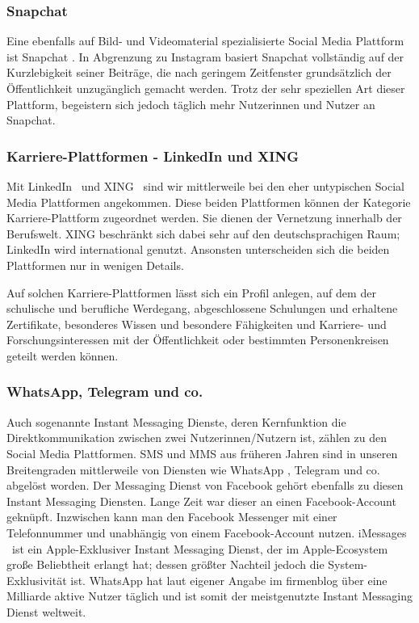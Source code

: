 \subsubsection{Snapchat}

Eine ebenfalls auf Bild- und Videomaterial spezialisierte Social Media Plattform ist Snapchat \faSnapchat. In Abgrenzung zu Instagram basiert Snapchat vollständig auf der Kurzlebigkeit seiner Beiträge, die nach geringem Zeitfenster grundsätzlich der Öffentlichkeit unzugänglich gemacht werden. Trotz der sehr speziellen Art dieser Plattform, begeistern sich jedoch täglich mehr Nutzerinnen und Nutzer an Snapchat.

\subsubsection{Karriere-Plattformen - LinkedIn und XING}

Mit LinkedIn \faLinkedin\ und XING \faXing\ sind wir mittlerweile bei den eher untypischen Social Media Plattformen angekommen. Diese beiden Plattformen können der Kategorie Karriere-Plattform zugeordnet werden. Sie dienen der Vernetzung innerhalb der Berufswelt. XING beschränkt sich dabei sehr auf den deutschsprachigen Raum; LinkedIn wird international genutzt. Ansonsten unterscheiden sich die beiden Plattformen nur in wenigen Details.

Auf solchen Karriere-Plattformen lässt sich ein Profil anlegen, auf dem der schulische und berufliche Werdegang, abgeschlossene Schulungen und erhaltene Zertifikate, besonderes Wissen und besondere Fähigkeiten und Karriere- und Forschungsinteressen mit der Öffentlichkeit oder bestimmten Personenkreisen geteilt werden können. 

\subsubsection{WhatsApp, Telegram und co.}

Auch sogenannte Instant Messaging Dienste, deren Kernfunktion die Direktkommunikation zwischen zwei Nutzerinnen/Nutzern ist, zählen zu den Social Media Plattformen. SMS und MMS aus früheren Jahren sind in unseren Breitengraden mittlerweile von Diensten wie WhatsApp \faWhatsapp, Telegram und co. abgelöst worden. Der Messaging Dienst von Facebook gehört ebenfalls zu diesen Instant Messaging Diensten. Lange Zeit war dieser an einen Facebook-Account geknüpft. Inzwischen kann man den Facebook Messenger mit einer Telefonnummer und unabhängig von einem Facebook-Account nutzen. iMessages \faApple\ ist ein Apple-Exklusiver Instant Messaging Dienst, der im Apple-Ecosystem große Beliebtheit erlangt hat; dessen größter Nachteil jedoch die System-Exklusivität ist. WhatsApp hat laut eigener Angabe im firmenblog über eine Milliarde aktive Nutzer täglich \cite{whatsappblog} und ist somit der meistgenutzte Instant Messaging Dienst weltweit.

